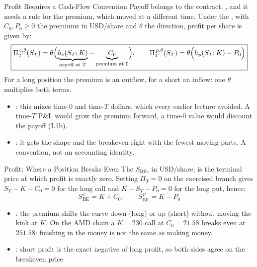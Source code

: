 \documentclass[aspectratio=169,11pt]{beamer}
\newcommand{\ST}{S_{T}}
\newcommand{\hc}{h_{c}}
\newcommand{\hp}{h_{p}}
\begin{document}
\begin{frame}{Profit Requires a Cash-Flow Convention}
  Payoff belongs to the contract. , and it
  needs a rule for the premium, which moved at a different time. Under the
  , with $C_0,P_0\geq0$ the premiums in USD/share
  and $\theta$ the direction, profit per share is given by:
  \[
    \boxed{\Pi_{T}^{\,c,\theta}(\ST)=\theta\Bigl(\underbrace{\hc(\ST;K)}_{\text{payoff at }T}-\underbrace{C_0}_{\text{premium at }0}\Bigr),
      \qquad
      \Pi_{T}^{\,p,\theta}(\ST)=\theta\Bigl(\hp(\ST;K)-P_0\Bigr)}
  \]
  For a long position the premium is an outflow, for a short an inflow: one
  $\theta$ multiplies both terms.
  \begin{itemize}\setlength{\itemsep}{0.25em}
    \item {}: this mixes time-$0$ and time-$T$ dollars,
      which every earlier lecture avoided. A time-$T$ P\&L would grow the
      premium forward, a time-$0$ value would discount the payoff (L1b).
    \item {}: it gets the shape and the breakeven right with the
      fewest moving parts. A convention, not an accounting identity.
  \end{itemize}
\end{frame}

\begin{frame}{Profit: Where a Position Breaks Even}
  The  $S_{\mathrm{BE}}$, in USD/share, is the terminal price at
  which profit is exactly zero. Setting $\Pi_T=0$ on the exercised branch gives
  $\ST-K-C_0=0$ for the long call and $K-\ST-P_0=0$ for the long put, hence:
  \[
    \boxed{S_{\mathrm{BE}}^{\,c}=K+C_0,\qquad S_{\mathrm{BE}}^{\,p}=K-P_0}
  \]
  \begin{itemize}\setlength{\itemsep}{0.3em}
    \item {}: the premium shifts the curve
      down (long) or up (short) without moving the kink at $K$. On the AMD chain
      a $K=230$ call at $C_0=21.58$ breaks even at $251.58$: finishing in the
      money is not the same as making money.
    \item {}: short profit is the exact negative
      of long profit, so both sides agree on the breakeven price.
  \end{itemize}
\end{frame}
\end{document}
